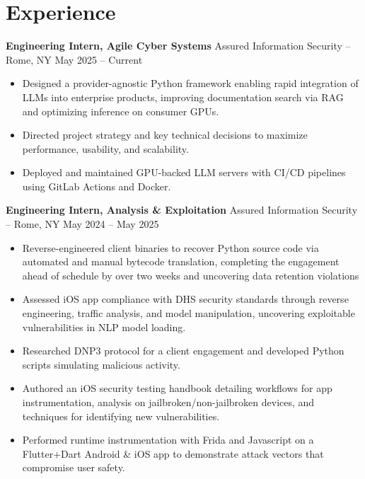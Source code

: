 \section*{Experience}
\textbf{Engineering Intern, Agile Cyber Systems} {Assured Information Security} -- Rome, NY \hfill May 2025 -- Current \\
\vspace{-8pt}
\begin{itemize}
	\item Designed a provider-agnostic Python framework enabling rapid integration of LLMs into enterprise products, improving documentation search via RAG and optimizing inference on consumer GPUs.
	\item Directed project strategy and key technical decisions to maximize performance, usability, and scalability.
	\item Deployed and maintained GPU-backed LLM servers with CI/CD pipelines using GitLab Actions and Docker.	
\end{itemize}
\vspace{-8pt}
\textbf{Engineering Intern, Analysis \& Exploitation} {Assured Information Security} -- Rome, NY \hfill May 2024 -- May 2025 \\
\vspace{-8pt}
\begin{itemize}
	\item Reverse-engineered client binaries to recover Python source code via automated and manual bytecode translation, completing the engagement ahead of schedule by over two weeks and uncovering data retention violations
	\item Assessed iOS app compliance with DHS security standards through reverse engineering, traffic analysis, and model manipulation, uncovering exploitable vulnerabilities in NLP model loading.
	\item Researched DNP3 protocol for a client engagement and developed Python scripts simulating malicious activity.
	\item Authored an iOS security testing handbook detailing workflows for app instrumentation, analysis on jailbroken/non-jailbroken devices, and techniques for identifying new vulnerabilities.
	\item Performed runtime instrumentation with Frida and Javascript on a Flutter+Dart Android \& iOS app to demonstrate attack vectors that compromise user safety.
\end{itemize}

